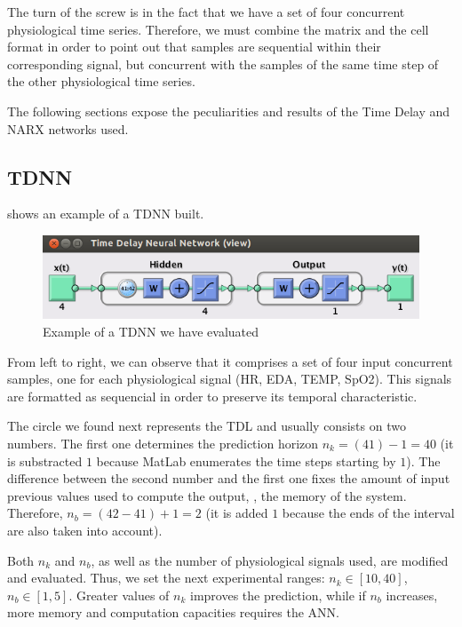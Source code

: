 The turn of the screw is in the fact that we have a set of four
concurrent physiological time series. Therefore, we must combine the
matrix and the cell format in order to point out that samples are
sequential within their corresponding signal, but concurrent with the
samples of the same time step of the other physiological time series.

The following sections expose the peculiarities and results of the
Time Delay and NARX networks used.



\subsection{TDNN}
\label{subsec:tdnnapplication}

 shows an example of a TDNN built.
\begin{figure}[!ht]
\centering
\includegraphics[width=0.9\columnwidth]{images/results/tdnn}
\caption{Example of a TDNN we have evaluated}
\label{fig:tdnnbuilt}
\end{figure}

From left to right, we can observe that it comprises a set of four input concurrent samples, 
one for each physiological signal (HR, EDA, TEMP, SpO2). This signals are formatted as sequencial in order to preserve its temporal characteristic.

The circle we found next represents the TDL and usually consists on two numbers. The first one determines the prediction horizon $n_{k}=(41)-1=40$ (it is substracted $1$ because MatLab enumerates the time steps starting by $1$). The difference between the second number and the first one fixes the amount of input previous values used to compute the output, \ie, the memory of the system. Therefore, $n_{b}=(42-41)+1=2$ (it is added $1$ because the ends of the interval are also taken into account).

Both $n_{k}$ and $n_{b}$, as well as the number of physiological signals used, are modified and evaluated. Thus, we set the next experimental ranges: $n_{k}\in [10,40]$, $n_{b}\in [1,5]$. Greater values of $n_{k}$ improves the prediction, while if $n_{b}$ increases, more memory and computation capacities requires the ANN.

